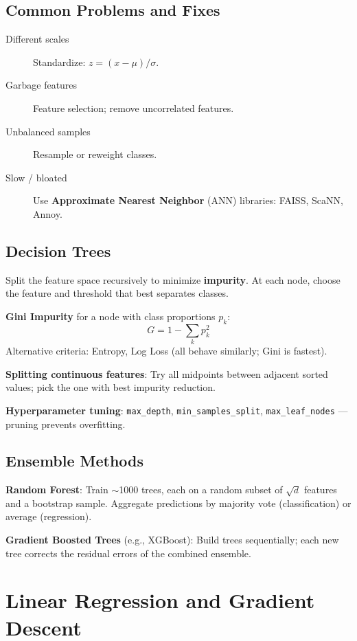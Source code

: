 \documentclass[11pt]{article}
\begin{document}
\subsection{Common Problems and Fixes}

\begin{description}
  \item[Different scales] Standardize: $z = (x - \mu)/\sigma$.
  \item[Garbage features] Feature selection; remove uncorrelated features.
  \item[Unbalanced samples] Resample or reweight classes.
  \item[Slow / bloated] Use \textbf{Approximate Nearest Neighbor} (ANN) libraries: FAISS, ScaNN, Annoy.
\end{description}

\subsection{Decision Trees}
Split the feature space recursively to minimize \textbf{impurity}. At each node, choose the feature and threshold that best separates classes.

\textbf{Gini Impurity} for a node with class proportions $p_k$:
\[
  G = 1 - \sum_k p_k^2
\]
Alternative criteria: Entropy, Log Loss (all behave similarly; Gini is fastest).

\textbf{Splitting continuous features}: Try all midpoints between adjacent sorted values; pick the one with best impurity reduction.

\textbf{Hyperparameter tuning}: \texttt{max\_depth}, \texttt{min\_samples\_split}, \texttt{max\_leaf\_nodes} — pruning prevents overfitting.

\subsection{Ensemble Methods}

\textbf{Random Forest}: Train $\sim$1000 trees, each on a random subset of $\sqrt{d}$ features and a bootstrap sample. Aggregate predictions by majority vote (classification) or average (regression).

\textbf{Gradient Boosted Trees} (e.g., XGBoost): Build trees sequentially; each new tree corrects the residual errors of the combined ensemble.

\section{Linear Regression and Gradient Descent}
\end{document}
